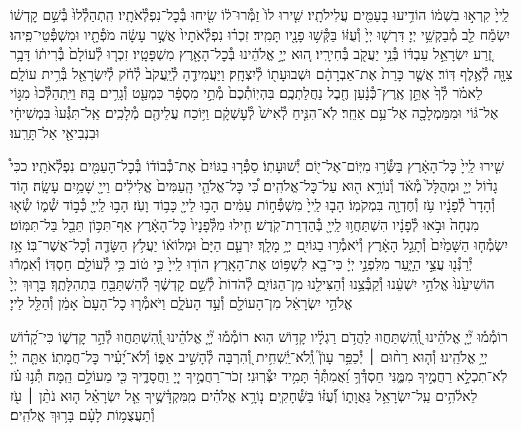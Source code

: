 \documentclass[twoside, openany, parskip=half, 11pt]{book}
\begin{document}
לַֽייָ֙ קִרְא֣וּ בִשְׁמ֔וֹ
הוֹדִ֥יעוּ בָעַמִּ֖ים עֲלִילֹתָֽיו׃
שִׁ֤ירוּ לוֹ֙ זַמְּ֯רוּ־ל֔וֹ שִׂ֖יחוּ בְּ֯כׇל־נִפְלְ֯אֹתָֽיו׃
הִֽתְהַלְ֯לוּ֙ בְּ֯שֵׁ֣ם קׇדְשׁ֔וֹ יִשְׂמַ֕ח לֵ֖ב מְ֯בַקְשֵׁ֥י יְיָ׃
דִּרְשׁ֤וּ יְיָ֙ וְ֯עֻזּ֔וֹ בַּקְּ֯שׁ֥וּ פָנָ֖יו תָּמִֽיד׃
זִכְר֗וּ נִפְלְ֯אֹתָיו֙ אֲשֶׁ֣ר עָשָׂ֔ה מֹפְ֯תָ֖יו וּמִשְׁפְּ֯טֵי־פִֽיהוּ׃
זֶ֚רַע יִשְׂרָאֵ֣ל עַבְדּ֔וֹ בְּ֯נֵ֥י יַעֲקֹ֖ב בְּ֯חִירָֽיו׃
ה֚וּא יְיָ֣ אֱלֹהֵ֔ינוּ בְּ֯כׇל־הָאָ֖רֶץ מִשְׁפָּטָֽיו׃
זִכְר֤וּ לְ֯עוֹלָם֙ בְּ֯רִית֔וֹ דָּבָ֥ר צִוָּ֖ה לְ֯אֶ֥לֶף דּֽוֹר׃
אֲשֶׁ֤ר כָּרַת֙ אֶת־אַבְרָהָ֔ם וּשְׁבוּעָת֖וֹ לְ֯יִצְחָֽק׃
וַיַּעֲמִידֶ֤הָ לְ֯יַֽעֲקֹב֙ לְ֯חֹ֔ק לְ֯יִשְׂרָאֵ֖ל בְּ֯רִ֥ית עוֹלָֽם׃
לֵאמֹ֗ר לְ֯ךָ֙ אֶתֵּ֣ן אֶֽרֶץ־כְּ֯נָ֔עַן חֶ֖בֶל נַחֲלַתְכֶֽם׃
בִּהְיֽוֹתְ֯כֶם֙ מְ֯תֵ֣י מִסְפָּ֔ר כִּמְעַ֖ט וְ֯גָרִ֥ים בָּֽהּ׃
וַיִּֽתְהַלְּ֯כוּ֙ מִגּ֣וֹי אֶל־גּ֔וֹי וּמִמַּמְלָכָ֖ה אֶל־עַ֥ם אַחֵֽר׃
לֹֽא־הִנִּ֤יחַ לְ֯אִישׁ֙ לְ֯עׇשְׁקָ֔ם וַיּ֥וֹכַח עֲלֵיהֶ֖ם מְ֯לָכִֽים׃
אַֽל־תִּגְּ֯עוּ֙ בִּמְשִׁיחָ֔י וּבִנְבִיאַ֖י אַל־תָּרֵֽעוּ׃

שִׁ֤ירוּ לַֽייָ֙ כׇּל־הָאָ֔רֶץ בַּשְּׂ֯ר֥וּ מִיּֽוֹם־אֶל־י֖וֹם יְ֯שׁוּעָתֽוֹ׃
סַפְּ֯ר֤וּ בַגּוֹיִם֙ אֶת־כְּ֯בוֹד֔וֹ בְּ֯כׇל־הָעַמִּ֖ים נִפְלְ֯אֹתָֽיו׃
ככִּי֩ גָד֨וֹל יְיָ֤ וּמְהֻלָּל֙ מְ֯אֹ֔ד וְ֯נוֹרָ֥א ה֖וּא עַל־כׇּל־אֱלֹהִֽים׃
כִּ֠י כׇּל־אֱלֹהֵ֤י הָֽעַמִּים֙ אֱלִילִ֔ים וַייָ֖ שָׁמַ֥יִם עָשָֽׂה׃
ה֤וֹד וְ֯הָדָר֙ לְ֯פָנָ֔יו עֹ֥ז וְ֯חֶדְוָ֖ה בִּמְקֹמֽוֹ׃
הָב֤וּ לַֽייָ֙ מִשְׁפְּ֯ח֣וֹת עַמִּ֔ים הָב֥וּ לַייָ֖ כָּב֥וֹד וָעֹֽז׃
הָב֥וּ לַֽייָ֖ כְּ֯ב֣וֹד שְׁ֯מ֑וֹ שְׂ֯א֤וּ מִנְחָה֙ וּבֹ֣אוּ לְ֯פָנָ֔יו
הִשְׁתַּחֲו֥וּ לַֽייָ֖ בְּ֯הַדְרַת־קֹֽדֶשׁ׃ חִ֤ילוּ מִלְּ֯פָנָיו֙ כׇּל־הָאָ֔רֶץ
אַף־תִּכּ֥וֹן תֵּבֵ֖ל בַּל־תִּמּֽוֹט׃ יִשְׂמְ֯ח֤וּ הַשָּׁמַ֙יִם֙ וְ֯תָגֵ֣ל הָאָ֔רֶץ
וְ֯יֹאמְ֯ר֥וּ בַגּוֹיִ֖ם יְיָ֥ מָלָֽךְ׃ יִרְעַ֤ם הַיָּם֙ וּמְלוֹא֔וֹ
יַעֲלֹ֥ץ הַשָּׂדֶ֖ה וְ֯כׇל־אֲשֶׁר־בּֽוֹ׃ אָ֥ז יְ֯רַנְּ֯נ֖וּ עֲצֵ֣י הַיָּ֑עַר
מִלִּפְנֵ֣י יְיָ֔ כִּי־בָ֖א לִשְׁפּ֥וֹט אֶת־הָאָֽרֶץ׃ הוֹד֤וּ לַֽייָ֙ כִּ֣י ט֔וֹב
כִּ֥י לְ֯עוֹלָ֖ם חַסְדּֽוֹ׃ וְ֯אִמְר֕וּ הוֹשִׁיעֵ֙נוּ֙ אֱלֹהֵ֣י יִשְׁעֵ֔נוּ
וְ֯קַבְּ֯צֵ֥נוּ וְ֯הַצִּילֵ֖נוּ מִן־הַגּוֹיִ֑ם לְ֯הֹדוֹת֙ לְ֯שֵׁ֣ם קׇדְשֶׁ֔ךָ
לְ֯הִשְׁתַּבֵּ֖חַ בִּתְהִלָּתֶֽךָ׃ בָּר֤וּךְ יְיָ֙ אֱלֹהֵ֣י יִשְׂרָאֵ֔ל
מִן־הָעוֹלָ֖ם וְ֯עַ֣ד הָעֹלָ֑ם וַיֹּאמְ֯ר֤וּ כׇל־הָעָם֙ אָמֵ֔ן וְ֯הַלֵּ֖ל לַייָ׃\\

\newcommand{\negline}{\vspace{-\baselineskip}}

\negline

%
רוֹמְ֯מ֡וּ יְ֘יָ֤ אֱלֹהֵ֗ינוּ וְֽ֭֯הִשְׁתַּחֲווּ לַהֲדֹ֥ם רַגְלָ֗יו קָד֥וֹשׁ הֽוּא׃
רוֹמְ֯מ֡וּ יְ֘יָ֤ אֱלֹהֵ֗ינוּ וְֽ֭֯הִשְׁתַּחֲווּ לְ֯הַ֣ר קׇדְשׁ֑וֹ כִּי־קָ֝ד֗וֹשׁ יְיָ֥ אֱלֹהֵֽינוּ׃
%
וְ֯ה֤וּא רַח֨וּם ׀ יְ֯כַפֵּ֥ר עָוֺן֮ וְֽ֯לֹא־יַֽ֫שְׁחִ֥ית וְ֭֯הִרְבָּה לְ֯הָשִׁ֣יב אַפּ֑וֹ
וְ֯לֹא־יָ֝עִ֗יר כׇּל־חֲמָתֽוֹ׃
%
אַתָּ֤ה יְיָ֗ לֹֽא־תִכְלָ֣א רַחֲמֶ֣יךָ מִמֶּ֑נִּי חַסְדְּ֯ךָ֥ וַ֝אֲמִתְּ֯ךָ֗ תָּמִ֥יד יִצְּ֯רֽוּנִי׃
זְכֹר־רַחֲמֶ֣יךָ יְיָ֭ וַחֲסָדֶ֑יךָ כִּ֖י מֵעוֹלָ֣ם הֵֽמָּה׃
תְּ֯נ֥וּ עֹ֗ז לֵאלֹ֫הִ֥ים עַֽל־יִשְׂרָאֵ֥ל גַּאֲוָת֑וֹ וְ֯֝עֻזּ֗וֹ בַּשְּׁ֯חָקִֽים׃
נ֤וֹרָ֥א אֱלֹהִ֗ים מִֽמִּקְדָּ֫שֶׁ֥יךָ אֵ֤ל יִשְׂרָאֵ֗ל
ה֤וּא נֹתֵ֨ן ׀ עֹ֖ז וְ֯תַעֲצֻמ֥וֹת לָעָ֗ם בָּר֥וּךְ אֱלֹהִֽים׃
\end{document}
